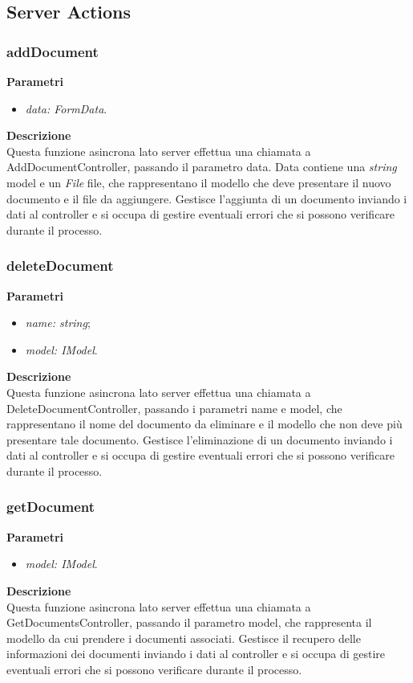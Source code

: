 \newpage


\subsection{Server Actions} \label{subsec:serveractions}

\subsubsection{addDocument}
\textbf{Parametri}
\begin{itemize}
    \item \textit{data: FormData}.
\end{itemize}
\textbf{Descrizione}\\
Questa funzione asincrona lato server effettua una chiamata a AddDocumentController, passando il parametro data. Data contiene una \textit{string} model e un \textit{File} file, che rappresentano il modello che deve presentare il nuovo documento e il file da aggiungere. Gestisce l'aggiunta di un documento inviando i dati al controller e si occupa di gestire eventuali errori che si possono verificare durante il processo.


\subsubsection{deleteDocument}
\textbf{Parametri}
\begin{itemize}[itemsep=-4pt]
    \item \textit{name: string};
    \item \textit{model: IModel}.
\end{itemize}
\textbf{Descrizione}\\
Questa funzione asincrona lato server effettua una chiamata a DeleteDocumentController, passando i parametri name e model, che rappresentano il nome del documento da eliminare e il modello che non deve più presentare tale documento. Gestisce l'eliminazione di un documento inviando i dati al controller e si occupa di gestire eventuali errori che si possono verificare durante il processo.

\subsubsection{getDocument}
\textbf{Parametri}
\begin{itemize}
    \item \textit{model: IModel}.
\end{itemize}
\textbf{Descrizione}\\
Questa funzione asincrona lato server effettua una chiamata a GetDocumentsController, passando il parametro model, che rappresenta il modello da cui prendere i documenti associati. Gestisce il recupero delle informazioni dei documenti inviando i dati al controller e si occupa di gestire eventuali errori che si possono verificare durante il processo.

